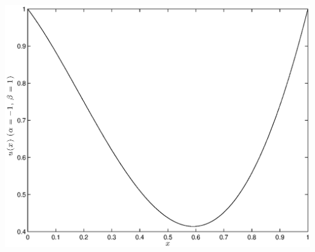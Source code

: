 \begin{solution}
\begin{enumerate}
\begin{center}
\includegraphics[scale=0.7]{hw5c.eps}
\end{center}



\end{enumerate}
\end{solution}